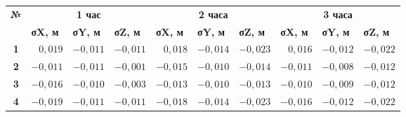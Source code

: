 \begin{table} [htbp]
	\centering\small
	\label{tab:tab07}{%
		\begin{tabular}{|c|rrr|rrr|rrr|}
			\hline
			\multirow{2}{*}{\textbf{№}} & 
			\multicolumn{3}{c|}{\textbf{1 час}}                                                                             & \multicolumn{3}{c|}{\textbf{2 часа}}                                                                            & \multicolumn{3}{c|}{\textbf{3 часа}}                                                                            \\ \cline{2-10} 
			& \multicolumn{1}{l|}{\textbf{σX, м}} & \multicolumn{1}{l|}{\textbf{σY, м}} & \multicolumn{1}{l|}{\textbf{σZ, м}} & \multicolumn{1}{l|}{\textbf{σX, м}} & \multicolumn{1}{l|}{\textbf{σY, м}} & \multicolumn{1}{l|}{\textbf{σZ, м}} & \multicolumn{1}{l|}{\textbf{σX, м}} & \multicolumn{1}{l|}{\textbf{σY, м}} & \multicolumn{1}{l|}{\textbf{σZ, м}} \\ \hline
			\textbf{1}                  & 
			\multicolumn{1}{r|}{$ 0,019$}       & \multicolumn{1}{r|}{$-0,011$}       & $-0,011$                            & \multicolumn{1}{r|}{$ 0,018$}       & \multicolumn{1}{r|}{$-0,014$}       & $-0,023$                            & \multicolumn{1}{r|}{$ 0,016$}       & \multicolumn{1}{r|}{$-0,012$}       & $-0,022$                            \\ \hline
			\textbf{2}                  & 
			\multicolumn{1}{r|}{$-0,011$}       & \multicolumn{1}{r|}{$-0,011$}       & $-0,001$                            & \multicolumn{1}{r|}{$-0,015$}       & \multicolumn{1}{r|}{$-0,010$}       & $-0,014$                            & \multicolumn{1}{r|}{$-0,011$}       & \multicolumn{1}{r|}{$-0,008$}       & $-0,012$                            \\ \hline
			\textbf{3}                  & 
			\multicolumn{1}{r|}{$-0,016$}       & \multicolumn{1}{r|}{$-0,010$}       & $-0,003$                            & \multicolumn{1}{r|}{$-0,013$}       & \multicolumn{1}{r|}{$-0,010$}       & $-0,013$                            & \multicolumn{1}{r|}{$-0,010$}       & \multicolumn{1}{r|}{$-0,009$}       & $-0,012$                            \\ \hline
			\textbf{4}                  & 
			\multicolumn{1}{r|}{$-0,019$}        & \multicolumn{1}{r|}{$-0,011$}       & $-0,011$                            & \multicolumn{1}{r|}{$-0,018$}        & \multicolumn{1}{r|}{$-0,014$}       & $-0,023$                            & \multicolumn{1}{r|}{$-0,016$}        & \multicolumn{1}{r|}{$-0,012$}       & $-0,022$                            \\ \hline

\end{tabular}}
\end{table}
